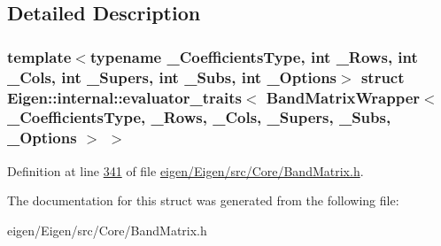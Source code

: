 \subsection{Detailed Description}
\subsubsection*{template$<$typename \+\_\+\+Coefficients\+Type, int \+\_\+\+Rows, int \+\_\+\+Cols, int \+\_\+\+Supers, int \+\_\+\+Subs, int \+\_\+\+Options$>$\newline
struct Eigen\+::internal\+::evaluator\+\_\+traits$<$ Band\+Matrix\+Wrapper$<$ \+\_\+\+Coefficients\+Type, \+\_\+\+Rows, \+\_\+\+Cols, \+\_\+\+Supers, \+\_\+\+Subs, \+\_\+\+Options $>$ $>$}



Definition at line \hyperlink{eigen_2_eigen_2src_2_core_2_band_matrix_8h_source_l00341}{341} of file \hyperlink{eigen_2_eigen_2src_2_core_2_band_matrix_8h_source}{eigen/\+Eigen/src/\+Core/\+Band\+Matrix.\+h}.



The documentation for this struct was generated from the following file\+:\begin{DoxyCompactItemize}
\item 
eigen/\+Eigen/src/\+Core/\+Band\+Matrix.\+h\end{DoxyCompactItemize}

